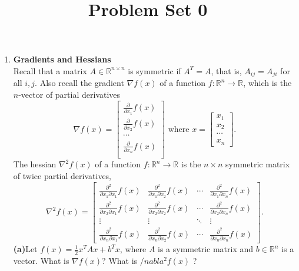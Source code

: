 \documentclass[reqno,twoside,a4paper,12pt]{amsart}
\title{Problem Set 0}
\begin{document}
\maketitle

\begin{enumerate}
    \item {\bf Gradients and Hessians}\\
        Recall that a matrix $A \in \mathbb{R}^{n \times n}$ is symmetric if $A^T = A$, that is, $A_{ij} = A_{ji}$ for all $i, j$. Also recall the gradient $\nabla f(x)$ of a function $f: \mathbb{R}^n \to \mathbb{R}$, which is the $n$-vector of partial derivatives
        \[
            \nabla f(x) = \begin{bmatrix}
                \frac{\partial }{\partial x_1}f(x) \\
                \frac{\partial }{\partial x_2}f(x) \\
                \cdots \\
                \frac{\partial }{\partial x_n}f(x) \\
            \end{bmatrix} \text{ where } x = 
            \begin{bmatrix}
                x_1 \\ x_2 \\ \cdots \\ x_n
            \end{bmatrix}.
        \]
        The hessian $\nabla ^2 f(x)$ of a function $f: \mathbb{R}^n \to \mathbb{R}$ is the $n \times n$ symmetric matrix of twice partial derivatives,
        \[
            \nabla ^2 f(x) = \begin{bmatrix}
                \frac{\partial ^2}{\partial x_1 \partial x_1}f(x) & \frac{\partial ^2}{\partial x_1 \partial x_2}f(x) & \cdots & \frac{\partial ^2}{\partial x_1 \partial x_n}f(x)\\
                \frac{\partial ^2}{\partial x_2 \partial x_1}f(x) & \frac{\partial ^2}{\partial x_2 \partial x_2}f(x) & \cdots & \frac{\partial ^2}{\partial x_2 \partial x_n}f(x) \\
                \vdots & \vdots & \ddots & \vdots \\
                \frac{\partial ^2}{\partial x_n \partial x_1}f(x) & \frac{\partial ^2}{\partial x_n \partial x_2}f(x) & \cdots & \frac{\partial ^2}{\partial x_n \partial x_n}f(x)
            \end{bmatrix}.
        \]
        {\bf (a)}Let $f(x) = \frac{1}{2}x^T Ax + b^T x$, where $A$ is a symmetric matrix and $b \in \mathbb{R}^n$ is a vector. What is $\nabla f(x)$? What is $/nabla ^2 f(x)$ ?

\end{enumerate}
\end{document}
